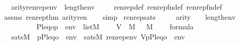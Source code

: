\begin{isabellebody}
\ \ \ {\isachardoublequoteopen}arity{\isacharparenleft}{\kern0pt}renrep{\isacharparenleft}{\kern0pt}{\isasymphi}{\isacharcomma}{\kern0pt}env{\isacharparenright}{\kern0pt}{\isacharparenright}{\kern0pt}\ {\isasymle}\ {}{\isacharhash}{\kern0pt}{\isacharplus}{\kern0pt}length{\isacharparenleft}{\kern0pt}env{\isacharparenright}{\kern0pt}{\isachardoublequoteclose}\isanewline
%
\isadelimproof
\ \ %
\endisadelimproof
%
\isatagproof
{}\isamarkupfalse%
\ \ renrep{\isacharunderscore}{\kern0pt}def\ renrep{\isacharunderscore}{\kern0pt}fn{\isacharunderscore}{\kern0pt}def\ renrep{}{\isacharunderscore}{\kern0pt}fn{\isacharunderscore}{\kern0pt}def\isanewline
\ \ \isamarkupfalse%
\ assms\ renrep{}{\isacharunderscore}{\kern0pt}thm{\isacharparenleft}{\kern0pt}{}{\isacharparenright}{\kern0pt}\ arity{\isacharunderscore}{\kern0pt}ren\isanewline
\ \ \isamarkupfalse%
\ simp%
\endisatagproof
{\isafoldproof}%
%
\isadelimproof
\isanewline
%
\endisadelimproof
\isanewline
{}\isamarkupfalse%
\ renrep{\isacharunderscore}{\kern0pt}sats\ {\isacharcolon}{\kern0pt}\isanewline
\ \ \ \ {\isachardoublequoteopen}arity{\isacharparenleft}{\kern0pt}{\isasymphi}{\isacharparenright}{\kern0pt}\ {\isasymle}\ {}\ {\isacharhash}{\kern0pt}{\isacharplus}{\kern0pt}\ length{\isacharparenleft}{\kern0pt}env{\isacharparenright}{\kern0pt}{\isachardoublequoteclose}\isanewline
\ \ \ \ \ \ \ \ \ \ {\isachardoublequoteopen}{\isacharbrackleft}{\kern0pt}P{\isacharcomma}{\kern0pt}leq{\isacharcomma}{\kern0pt}o{\isacharcomma}{\kern0pt}p{\isacharcomma}{\kern0pt}{\isasymrho}{\isacharcomma}{\kern0pt}{\isasymtau}{\isacharbrackright}{\kern0pt}\ {\isacharat}{\kern0pt}\ env\ {\isasymin}\ list{\isacharparenleft}{\kern0pt}M{\isacharparenright}{\kern0pt}{\isachardoublequoteclose}\isanewline
\ \ \ \ {\isachardoublequoteopen}V\ {\isasymin}\ M{\isachardoublequoteclose}\ {\isachardoublequoteopen}{\isasymalpha}\ {\isasymin}\ M{\isachardoublequoteclose}\isanewline
\ \ \ \ {\isachardoublequoteopen}{\isasymphi}{\isasymin}formula{\isachardoublequoteclose}\isanewline
\ \ \ {\isachardoublequoteopen}sats{\isacharparenleft}{\kern0pt}M{\isacharcomma}{\kern0pt}\ {\isasymphi}{\isacharcomma}{\kern0pt}\ {\isacharbrackleft}{\kern0pt}p{\isacharcomma}{\kern0pt}P{\isacharcomma}{\kern0pt}leq{\isacharcomma}{\kern0pt}o{\isacharcomma}{\kern0pt}{\isasymrho}{\isacharcomma}{\kern0pt}{\isasymtau}{\isacharbrackright}{\kern0pt}\ {\isacharat}{\kern0pt}\ env{\isacharparenright}{\kern0pt}\ {\isasymlongleftrightarrow}\ sats{\isacharparenleft}{\kern0pt}M{\isacharcomma}{\kern0pt}\ renrep{\isacharparenleft}{\kern0pt}{\isasymphi}{\isacharcomma}{\kern0pt}env{\isacharparenright}{\kern0pt}{\isacharcomma}{\kern0pt}\ {\isacharbrackleft}{\kern0pt}V{\isacharcomma}{\kern0pt}{\isasymtau}{\isacharcomma}{\kern0pt}{\isasymrho}{\isacharcomma}{\kern0pt}p{\isacharcomma}{\kern0pt}{\isasymalpha}{\isacharcomma}{\kern0pt}P{\isacharcomma}{\kern0pt}leq{\isacharcomma}{\kern0pt}o{\isacharbrackright}{\kern0pt}\ {\isacharat}{\kern0pt}\ env{\isacharparenright}{\kern0pt}{\isachardoublequoteclose}\isanewline

\end{isabellebody}
